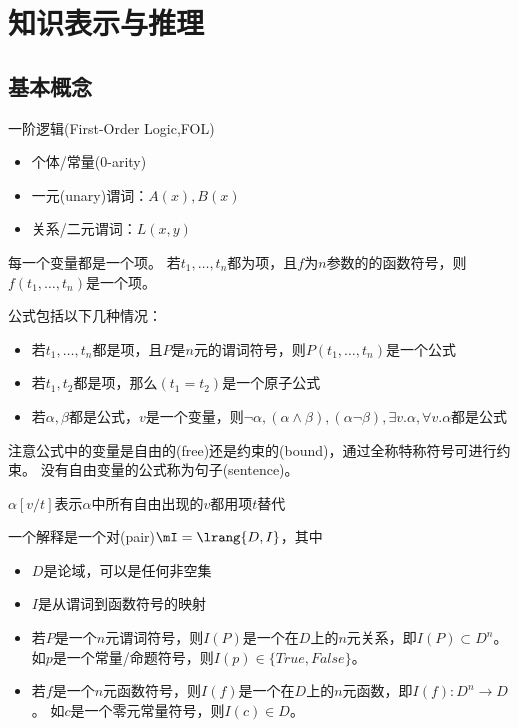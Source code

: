 
\section{知识表示与推理}
\subsection{基本概念}
一阶逻辑(First-Order Logic,FOL)
\begin{itemize}
	\item 个体/常量(0-arity)
	\item 一元(unary)谓词：$A(x),B(x)$
	\item 关系/二元谓词：$L(x,y)$
\end{itemize}

\begin{definition}[项(term)]
每一个变量都是一个项。
若$t_1,\ldots,t_n$都为项，且$f$为$n$参数的的函数符号，则$f(t_1,\ldots,t_n)$是一个项。
\end{definition}
\begin{definition}[公式(formular)]
公式包括以下几种情况：
\begin{itemize}
\item 若$t_1,\ldots,t_n$都是项，且$P$是$n$元的谓词符号，则$P(t_1,\ldots,t_n)$是一个公式
\item 若$t_1,t_2$都是项，那么$(t_1=t_2)$是一个原子公式
\item 若$\alpha,\beta$都是公式，$v$是一个变量，则$\lnot\alpha,(\alpha\land\beta),(\alpha\lnot\beta),\exists v.\alpha,\forall v.\alpha$都是公式
\end{itemize}
注意公式中的变量是自由的(free)还是约束的(bound)，通过全称特称符号可进行约束。
没有自由变量的公式称为句子(sentence)。
\end{definition}
\begin{definition}[替换]
$\alpha[v/t]$表示$\alpha$中所有自由出现的$v$都用项$t$替代
\end{definition}
\begin{definition}[解释(interpretation)]
一个解释是一个对(pair)$\mI=\lrang{D,I}$，其中
\begin{itemize}
	\item $D$是论域，可以是任何非空集
	\item $I$是从谓词到函数符号的映射
	\item 若$P$是一个$n$元谓词符号，则$I(P)$是一个在$D$上的$n$元关系，即$I(P)\subset D^n$。
	如$p$是一个常量/命题符号，则$I(p)\in\{True,False\}$。
	\item 若$f$是一个$n$元函数符号，则$I(f)$是一个在$D$上的$n$元函数，即$I(f):D^n\to D$。
	如$c$是一个零元常量符号，则$I(c)\in D$。
\end{itemize}
\end{definition}
